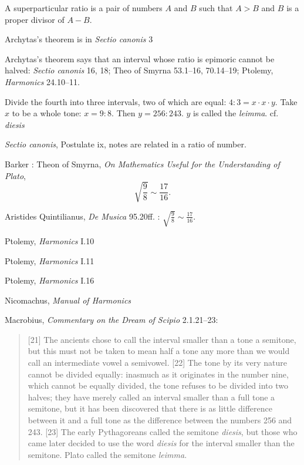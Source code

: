 \documentclass{article}
\theoremstyle{definition}
\begin{document}
A superparticular ratio is a pair of numbers $A$ and $B$ such that $A>B$ and
$B$ is a proper divisor of $A-B$.

Archytas's theorem is in {\em Sectio canonis} 3

Archytas's theorem says that an interval whose ratio is epimoric cannot be halved: {\em Sectio canonis} 16, 18; 
Theo of Smyrna 53.1--16, 70.14--19; 
Ptolemy, {\em Harmonics} 24.10--11.

Divide the fourth into three intervals, two of which are equal:
$4:3 = x \cdot x \cdot y$. Take $x$ to be a whole tone: $x=9:8$. Then $y=256:243$. 
$y$ is called the {\em leimma}. cf. {\em diesis}

{\em Sectio canonis}, Postulate ix, notes are related in a ratio of number.

Barker \cite[p.~223]{barker}: Theon of Smyrna, {\em On Mathematics Useful for the Understanding of Plato},
\[
\sqrt{\frac{9}{8}} \sim \frac{17}{16}.
\]

Aristides Quintilianus, {\em De Musica} 95.20ff. \cite[p.~496]{barker}: $\sqrt{\frac{9}{8}} \sim \frac{17}{16}$. 

Ptolemy, {\em Harmonics} I.10 \cite[pp.~297--298]{barker}

Ptolemy, {\em Harmonics} I.11 \cite[pp.~298--299]{barker}

Ptolemy, {\em Harmonics} I.16 \cite[pp.~312--313]{barker}

Nicomachus, {\em Manual of Harmonics}

Macrobius, {\em Commentary on the Dream of Scipio} \cite[pp.~188--189]{macrobius} 2.1.21--23:

\begin{quote}
[21] The ancients chose to call the interval smaller than a tone a semitone, but this must not be taken to mean half a tone
any more than we would call an intermediate vowel a semivowel. [22] The tone by its
very nature cannot be divided equally: inasmuch as it originates in the number nine, which cannot be equally divided,
the tone refuses to be divided into two halves; they have merely called an interval smaller than a full tone a semitone,
but it has been discovered that there is as little difference between it and a full tone as the difference
between the numbers 256 and 243. [23] The early Pythagoreans called the semitone {\em diesis}, but those who came later
decided to use the word {\em diesis} for the interval smaller than the semitone. Plato called the semitone
{\em leimma}.
\end{quote}
\end{document}
